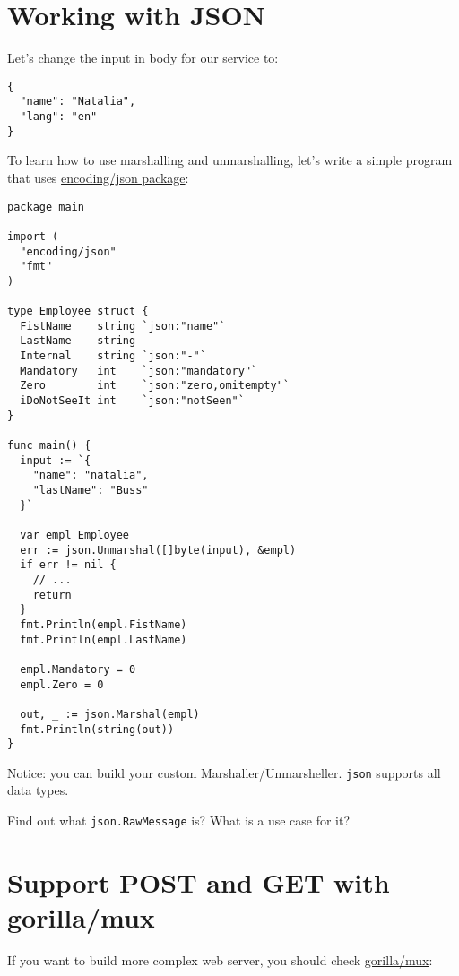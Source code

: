 \documentclass[11pt, letterpaper]{article}
\begin{document}
\section{Working with JSON}

Let's change the input in body for our service to:

\begin{verbatim}
{
  "name": "Natalia",
  "lang": "en"
}
\end{verbatim}

To learn how to use marshalling and unmarshalling, let's write a simple program that uses \href{https://golang.org/pkg/encoding/json/}{encoding/json package}:

\begin{verbatim}
package main

import (
  "encoding/json"
  "fmt"
)

type Employee struct {
  FistName    string `json:"name"`
  LastName    string
  Internal    string `json:"-"`
  Mandatory   int    `json:"mandatory"`
  Zero        int    `json:"zero,omitempty"`
  iDoNotSeeIt int    `json:"notSeen"`
}

func main() {
  input := `{
    "name": "natalia",
    "lastName": "Buss"
  }`

  var empl Employee
  err := json.Unmarshal([]byte(input), &empl)
  if err != nil {
    // ...
    return
  }
  fmt.Println(empl.FistName)
  fmt.Println(empl.LastName)

  empl.Mandatory = 0
  empl.Zero = 0

  out, _ := json.Marshal(empl)
  fmt.Println(string(out))
}
\end{verbatim}

Notice: you can build your custom Marshaller/Unmarsheller. \verb|json| supports all data types.

\bigskip

Find out what \verb|json.RawMessage| is? What is a use case for it?

\section{Support POST and GET with gorilla/mux}

If you want to build more complex web server, you should check \href{https://github.com/gorilla/mux}{gorilla/mux}:
\end{document}
